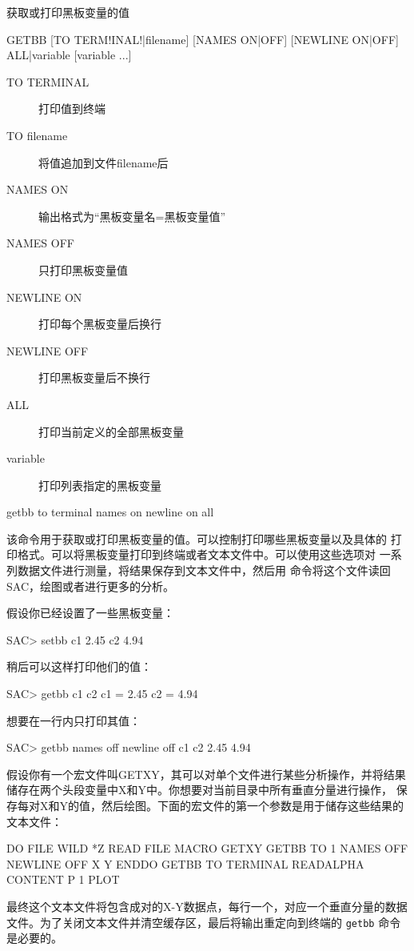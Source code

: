 \label{cmd:getbb}

获取或打印黑板变量的值

\begin{SACSTX}
GETBB [TO TERM!INAL!|filename] [NAMES ON|OFF] [NEWLINE ON|OFF]
    ALL|variable [variable ...]
\end{SACSTX}

\begin{description}
\item [TO TERMINAL] 打印值到终端
\item [TO filename] 将值追加到文件filename后
\item [NAMES ON] 输出格式为``黑板变量名=黑板变量值''
\item [NAMES OFF] 只打印黑板变量值
\item [NEWLINE ON] 打印每个黑板变量后换行
\item [NEWLINE OFF] 打印黑板变量后不换行
\item [ALL] 打印当前定义的全部黑板变量
\item [variable] 打印列表指定的黑板变量
\end{description}

\begin{SACDFT}
getbb to terminal names on newline on all
\end{SACDFT}

该命令用于获取或打印黑板变量的值。可以控制打印哪些黑板变量以及具体的
打印格式。可以将黑板变量打印到终端或者文本文件中。可以使用这些选项对
一系列数据文件进行测量，将结果保存到文本文件中，然后用 
命令将这个文件读回SAC，绘图或者进行更多的分析。

假设你已经设置了一些黑板变量：
\begin{SACCode}
SAC> setbb c1 2.45 c2 4.94
\end{SACCode}

稍后可以这样打印他们的值：
\begin{SACCode}
SAC> getbb c1 c2
 c1 = 2.45
 c2 = 4.94
\end{SACCode}

想要在一行内只打印其值：
\begin{SACCode}
SAC> getbb names off newline off c1 c2
 2.45 4.94
\end{SACCode}

假设你有一个宏文件叫GETXY，其可以对单个文件进行某些分析操作，并将结果
储存在两个头段变量中X和Y中。你想要对当前目录中所有垂直分量进行操作，
保存每对X和Y的值，然后绘图。下面的宏文件的第一个参数是用于储存这些结果的
文本文件：
\begin{SACCode}
DO FILE WILD *Z
  READ FILE
  MACRO GETXY
  GETBB TO 1 NAMES OFF NEWLINE OFF X Y
ENDDO
GETBB TO TERMINAL
READALPHA CONTENT P 1
PLOT
\end{SACCode}
最终这个文本文件将包含成对的X-Y数据点，每行一个，对应一个垂直分量的数据
文件。为了关闭文本文件并清空缓存区，最后将输出重定向到终端的 \texttt{getbb}
命令是必要的。
